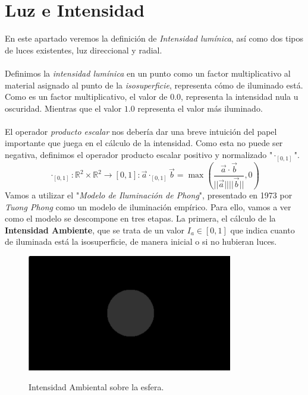 \section{Luz e Intensidad}
En este apartado veremos la definición de \textit{Intensidad lumínica}, así como dos tipos de luces existentes, luz direccional y radial.\\\\
 Definimos la \textit{intensidad lumínica} en un punto como un factor multiplicativo al material asignado al punto de la \textit{isosuperficie}, representa cómo de iluminado está. Como es un factor multiplicativo, el valor de \(0.0\), representa la intensidad nula u oscuridad. Mientras que el valor \(1.0\) representa el valor más iluminado.\\\\ 
El operador \textit{producto escalar} nos debería dar una breve intuición del papel importante que juega en el cálculo de la intensidad. Como esta no puede ser negativa, definimos el operador producto escalar positivo y normalizado "\(\cdot_{[0,1]}\)".
\[\cdot_{[0,1]}:\mathbb{R}^2\times\mathbb{R}^2\longrightarrow[0,1] : \Vec{a}\cdot_{[0,1]}\Vec{b}=\max\left(\dfrac{\Vec{a}\cdot \Vec{b}}{\vert\vert\Vec{a}\vert\vert\vert\vert \Vec{b}\vert\vert}, 0\right)\]
Vamos a utilizar el "\textit{Modelo de Iluminación de Phong}", presentado en 1973 por \textit{Tuong Phong} como un modelo de iluminación empírico. Para ello, vamos a ver como el modelo se descompone en tres etapas. La primera, el cálculo de la \textbf{Intensidad Ambiente}, que se trata de un valor \(I_a \in [0,1]\) que indica cuanto de iluminada está la isosuperficie, de manera inicial o si no hubieran luces. 
\begin{figure}[H]
  \centering
  \captionsetup{justification=centering}%
  \includegraphics[width=0.8\textwidth]{secciones/imagenes/ambiental.jpeg}\label{fig:ambient}
  \caption{Intensidad Ambiental sobre la esfera.}
\end{figure}
